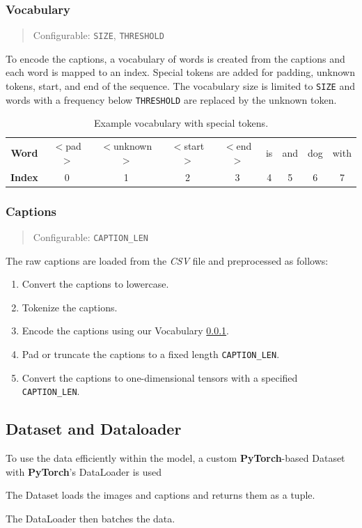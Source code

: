 \documentclass[12pt]{article}
\theoremstyle{plain}
\theoremstyle{definition}
\theoremstyle{remark}
\begin{document}
\subsubsection{Vocabulary}\label{sec:vocabulary}
\begin{quote}\center Configurable: \texttt{SIZE}, \texttt{THRESHOLD} \end{quote}
To encode the captions, a vocabulary of words is created from the captions and each word is mapped to an index. Special tokens are added for padding, unknown tokens, start, and end of the sequence. The vocabulary size is limited to \texttt{SIZE} and words with a frequency below \texttt{THRESHOLD} are replaced by the unknown token.

\begin{table}[H]
    \begin{tabular}{c|cccccccc}
        \textbf{Word}  & $<$pad$>$ & $<$unknown$>$ & $<$start$>$ & $<$end$>$ & is & and & dog & with \\
        \textbf{Index} & 0         & 1             & 2           & 3         & 4  & 5   & 6   & 7
    \end{tabular}
    \caption{Example vocabulary with special tokens. \label{tab:vocabulary}}
\end{table}

\subsubsection{Captions}\label{sec:captions}
\begin{quote}\center Configurable: \texttt{CAPTION\_LEN}\end{quote}
The raw captions are loaded from the \textit{CSV} file and preprocessed as follows:
\begin{enumerate}
    \item Convert the captions to lowercase.
    \item Tokenize the captions.
    \item Encode the captions using our Vocabulary \ref{sec:vocabulary}.
    \item Pad or truncate the captions to a fixed length \texttt{CAPTION\_LEN}.
    \item Convert the captions to one-dimensional tensors with a specified \texttt{CAPTION\_LEN}.
\end{enumerate}

\subsection{Dataset and Dataloader}\label{sec:dataset}
To use the data efficiently within the model, a custom \textbf{PyTorch}-based Dataset with \textbf{PyTorch}'s DataLoader is used
\par The Dataset loads the images and captions and returns them as a tuple.
\par The DataLoader then batches the data.
\end{document}

